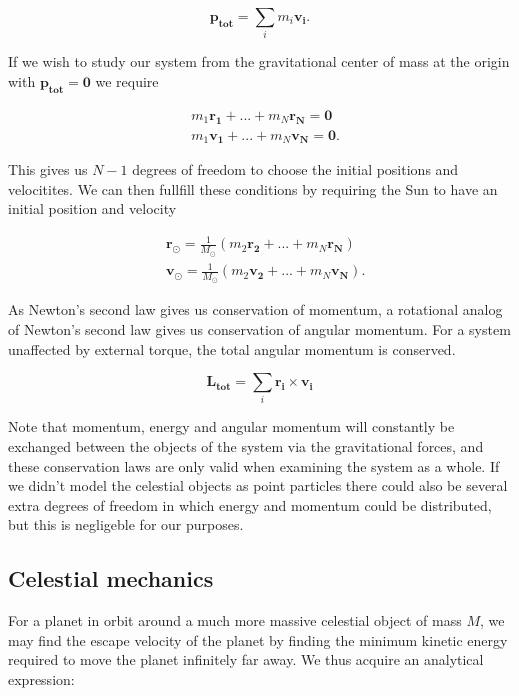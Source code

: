 \documentclass[%
 reprint,
 nobalance,
 amsmath,amssymb,
 aps,
]{revtex4-1}
\begin{document}
\begin{equation}
	\bm{p_{tot}} = \sum_i{m_i\bm{v_i}}.
\end{equation}

If we wish to study our system from the gravitational center of mass at the origin with $\bm{p_{tot} = 0}$ we require

\begin{equation}
\begin{split}
	& m_1 \bm{r_1} + ... + m_N \bm{r_N} = \bm{0} \\
	& m_1 \bm{v_1} + ... + m_N \bm{v_N} = \bm{0}.
\end{split}
\end{equation}

This gives us $N-1$ degrees of freedom to choose the initial positions and velocitites. We can then fullfill these conditions by requiring the Sun to have an initial position and velocity

\begin{equation}
\begin{split}
	& \bm{r_{\odot}} = \frac{1}{M_{\odot}}(m_2 \bm{r_2} + ... + m_N \bm{r_N}) \\
	& \bm{v_{\odot}} = \frac{1}{M_{\odot}}(m_2 \bm{v_2} + ... + m_N \bm{v_N}).
\end{split}
\end{equation}

As Newton's second law gives us conservation of momentum, a rotational analog of Newton's second law gives us conservation of angular momentum.
For a system unaffected by external torque, the total angular momentum is conserved.

\begin{equation}\label{eq:14}
	\bm{L_{tot}} = \sum_{i}{\bm{r_i} \times \bm{v_i}}
\end{equation}

Note that momentum, energy and angular momentum will constantly be exchanged between the objects of the system via the gravitational forces, and these conservation laws are only valid when examining the system as a whole. If we didn't model the celestial objects as point particles there could also be several extra degrees of freedom in which energy and momentum could be distributed, but this is negligeble for our purposes.

\subsection{\label{sec:Cel}Celestial mechanics}
For a planet in orbit around a much more massive celestial object of mass $M$, we may find the escape velocity of the planet by finding the minimum kinetic energy required to move the planet infinitely far away. We thus acquire an analytical expression:
\end{document}
